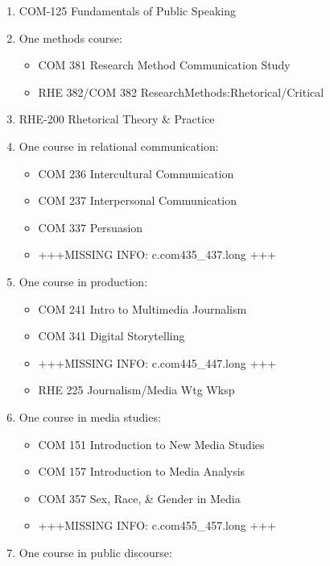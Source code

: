 \documentclass[
  letterpaper,
]{scrbook}
\providecommand{\tightlist}{%
  \setlength{\itemsep}{0pt}\setlength{\parskip}{0pt}}
\begin{document}
\begin{enumerate}
\def\labelenumi{\arabic{enumi}.}
\tightlist
\item
  COM-125 Fundamentals of Public Speaking
\item
  One methods course:

  \begin{itemize}
  \tightlist
  \item
    COM 381 Research Method Communication Study
  \item
    RHE 382/COM 382 ResearchMethods:Rhetorical/Critical
  \end{itemize}
\item
  RHE-200 Rhetorical Theory \& Practice
\item
  One course in relational communication:

  \begin{itemize}
  \tightlist
  \item
    COM 236 Intercultural Communication
  \item
    COM 237 Interpersonal Communication
  \item
    COM 337 Persuasion
  \item
    +++MISSING INFO: c.com435\_437.long +++
  \end{itemize}
\item
  One course in production:

  \begin{itemize}
  \tightlist
  \item
    COM 241 Intro to Multimedia Journalism
  \item
    COM 341 Digital Storytelling
  \item
    +++MISSING INFO: c.com445\_447.long +++
  \item
    RHE 225 Journalism/Media Wtg Wksp
  \end{itemize}
\item
  One course in media studies:

  \begin{itemize}
  \tightlist
  \item
    COM 151 Introduction to New Media Studies
  \item
    COM 157 Introduction to Media Analysis
  \item
    COM 357 Sex, Race, \& Gender in Media
  \item
    +++MISSING INFO: c.com455\_457.long +++
  \end{itemize}
\item
  One course in public discourse:


\end{enumerate}
\end{document}
